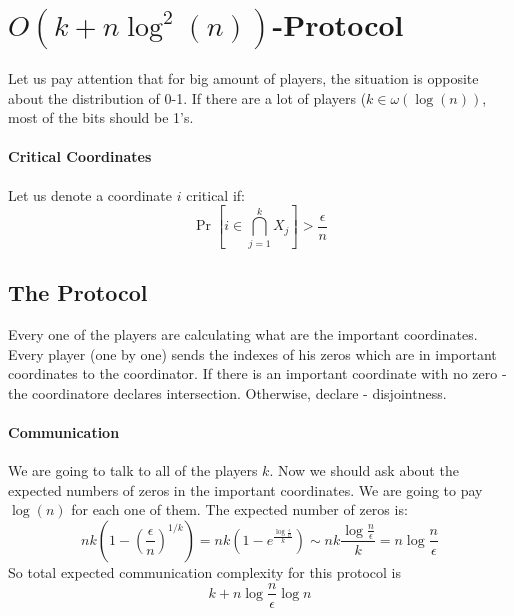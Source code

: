 \documentclass{article}
\theoremstyle{plain}
\begin{document}
\section{$O(k + n\log^2(n))$-Protocol}
Let us pay attention that for big amount of players, the situation is opposite about the distribution of 0-1. If there are a lot of players ($k \in \omega(\log(n))$, most of the bits should be 1's.
\paragraph{Critical Coordinates}
Let us denote a coordinate $i$ critical if:
\begin{equation*}
    \Pr[i \in \bigcap^{k}_{j=1}{X_j}] > \frac{\epsilon}{n}
\end{equation*}
\subsection{The Protocol}
Every one of the players are calculating what are the important coordinates.
Every player (one by one) sends the indexes of his zeros which are in important coordinates to the coordinator.
If there is an important coordinate with no zero - the coordinatore declares intersection.
Otherwise, declare - disjointness.
\paragraph{Communication}
We are going to talk to all of the players $k$.
Now we should ask about the expected numbers of zeros in the important coordinates. We are going to pay $\log(n)$ for each one of them.
The expected number of zeros is:
\begin{equation*}
    nk\left(1-\left(\frac{\epsilon}{n}\right)^{1/k}\right) = nk\left(1-e^{\frac{\log{\frac{\epsilon}{n}}}{k}}\right) \sim nk\frac{\log{\frac{n}{\epsilon}}}{k} = n\log{\frac{n}{\epsilon}}
\end{equation*}
So total expected communication complexity for this protocol is
\begin{equation*}
    k + n\log{\frac{n}{\epsilon}}\log n
\end{equation*}
\end{document}
